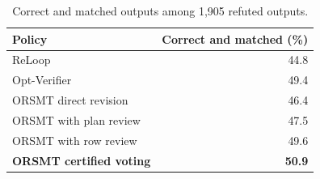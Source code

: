 \begin{table}[htbp]
\caption{Correct and matched outputs among 1,905 refuted outputs.}
\label{tab:newrepairquality}
\centering\footnotesize
\setlength{\tabcolsep}{7pt}
\begin{tabular*}{0.62\textwidth}{@{\extracolsep{\fill}}lr@{}}
\toprule
Policy & Correct and matched (\%)\\
\midrule
ReLoop & 44.8\\
Opt-Verifier & 49.4\\
ORSMT direct revision & 46.4\\
ORSMT with plan review & 47.5\\
ORSMT with row review & 49.6\\
\textbf{ORSMT certified voting} & \textbf{50.9}\\
\bottomrule
\end{tabular*}
\end{table}
